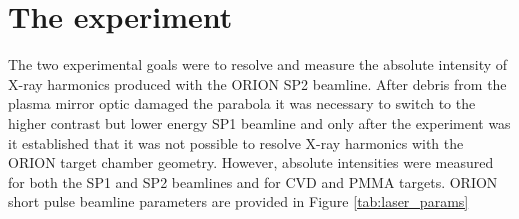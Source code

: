 
\section{\label{ch:3-sec:experiment}The experiment}
The two experimental goals were to resolve and measure the absolute intensity of X-ray harmonics produced with the ORION SP2 beamline. After debris from the plasma mirror optic damaged the parabola it was necessary to switch to the higher contrast but lower energy SP1 beamline and only after the experiment was it established that it was not possible to resolve X-ray harmonics with the ORION target chamber geometry. However, absolute intensities were measured for both the SP1 and SP2 beamlines and for CVD and PMMA targets. ORION short pulse beamline parameters are provided in Figure \ref{tab:laser_params}

